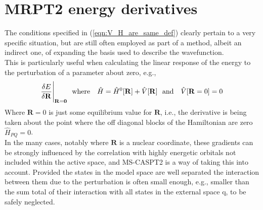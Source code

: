 \section {MRPT2 energy derivatives}
\noindent The conditions specified in (\ref{eqn:V_H_are_same_def}) clearly pertain to 
a very specific situation, but are still often employed as part of a method, albeit an 
indirect one, of expanding the basis used to describe the wavefunction.\\

\noindent This is particularly useful when calculating the linear response of the energy to the
perturbation of a parameter about zero, e.g., 
\begin{equation}
\frac{ \delta E }{ \delta \mathbf{R} } \Bigg{|}_{\mathbf{\mathbf{R}=0}}
\text{\ \ where \ \ }
\hat{H} = \hat{H}^{0}[\mathbf{R}] + \hat{V}[\mathbf{R}] 
\text{\ \ and \ \ }
\hat{V}[\mathbf{R} = 0 ]  = 0 
\end{equation}
Where $\mathbf{R} = 0$ is just some equilibrium value for $\mathbf{R}$, i.e., the derivative is being taken
about the point where the off diagonal blocks of the Hamiltonian are zero $\hat{H}_{PQ} = 0$. \\

\noindent  In the many cases, notably where $\mathbf{R}$ is a nuclear coordinate,
these gradients can be strongly influenced by the correlation with highly energetic orbitals not included
within the active space, and MS-CASPT2 is a way of taking this into account.
Provided the states in the model space are well separated the interaction between them due
to the perturbation is often small enough, e.g., smaller than the sum total of their 
interaction with all states in the external space $\mathrm{q}$, to be safely neglected.\\

